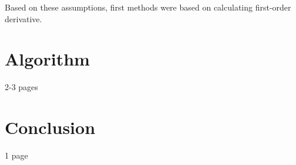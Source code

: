 \documentclass[12pt,a4paper,oneside,titlepage]{article}
\begin{document}
Based on these assumptions, first methods were based on calculating first-order derivative.



\newpage
\section*{Algorithm}
2-3 pages



\newpage
\section*{Conclusion}
1 page


\newpage
\renewcommand\refname{Bibliography}


\end{document}
